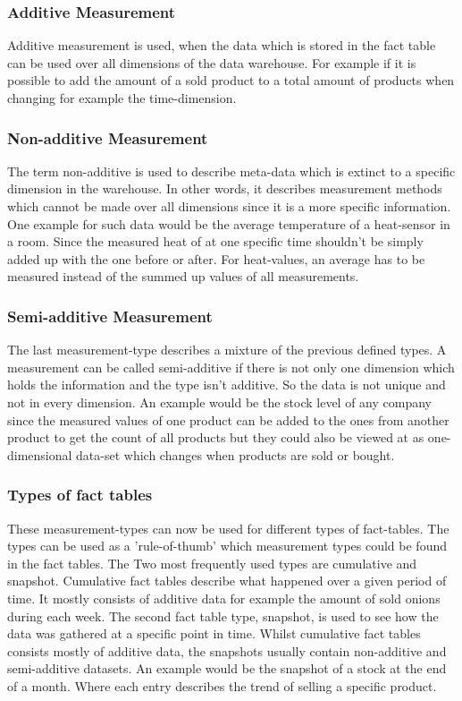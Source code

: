 \documentclass[12pt,a4paper,oneside,
liststotoc, 					%
bibtotoc,						%
titlepage, 						%
headsepline, 					%
BCOR6mm,						%
openany,							%
]{scrreprt}
\begin{document}
\subsubsection{Additive Measurement}
Additive measurement is used, when the data which is stored in the fact table can be used over all dimensions of the data warehouse. For example if it is possible to add the amount of a sold product to a total amount of products when changing for example the time-dimension.
\subsubsection{Non-additive Measurement}
The term non-additive is used to describe meta-data which is extinct to a specific dimension in the warehouse. In other words, it describes measurement methods which cannot be made over all dimensions since it is a more specific information. One example for such data would be the average temperature of a heat-sensor in a room. Since the measured heat of at one specific time shouldn't be simply added up with the one before or after. For heat-values, an average has to be measured instead of the summed up values of all measurements.
\subsubsection{Semi-additive Measurement}
The last measurement-type describes a mixture of the previous defined types. A measurement can be called semi-additive if there is not only one dimension which holds the information and the type isn't additive. So the data is not unique and not in every dimension. An example would be the stock level of any company since the measured values of one product can be added to the ones from another product to get the count of all products but they could also be viewed at as one-dimensional data-set which changes when products are sold or bought.
\subsubsection{Types of fact tables}
These measurement-types can now be used for different types of fact-tables. The types can be used as a 'rule-of-thumb' which measurement types could be found in the fact tables. The Two most frequently used types are cumulative and snapshot. Cumulative fact tables describe what happened over a given period of time. It mostly consists of additive data for example the amount of sold onions during each week. The second fact table type, snapshot, is used to see how the data was gathered at a specific point in time. Whilst cumulative fact tables consists mostly of additive data, the snapshots usually contain non-additive and semi-additive datasets. An example would be the snapshot of a stock at the end of a month. Where each entry describes the trend of selling a specific product.
\end{document}
